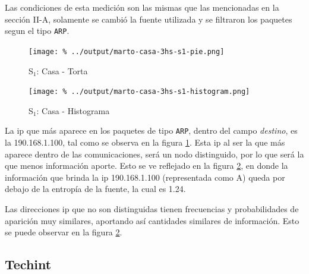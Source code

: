 \documentclass[final,inline,a4paper,narroweqnarray]{ieee}
\begin{document}
  Las condiciones de esta medición son las mismas que las mencionadas en la
  sección II-A, solamente se cambió la fuente utilizada y se filtraron los
  paquetes segun el tipo \texttt{ARP}.

    \begin{figure}[ht]\begin{center}
      \texttt{[image: \%
      ../output/marto-casa-3hs-s1-pie.png]}
      \vspace{-2em}
      \caption{S$_1$: Casa - Torta}
      \label{marto-casa-3hs-s1-pie}
    \end{center}\end{figure}

    \begin{figure}[ht]\begin{center}
      \texttt{[image: \%
      ../output/marto-casa-3hs-s1-histogram.png]}
      \vspace{-2em}
      \caption{S$_1$: Casa - Histograma}
      \label{marto-casa-3hs-s1-histogram}
    \end{center}\end{figure}	

  La ip que más aparece en los paquetes de tipo \texttt{ARP}, dentro del
  campo \textit{destino}, es la 190.168.1.100, tal como se observa en la
  figura \ref{marto-casa-3hs-s1-pie}. Esta ip al ser la que más aparece
  dentro de las comunicaciones, será un nodo distinguido, por lo que será la
  que menos información aporte. Esto se ve reflejado en la figura
  \ref{marto-casa-3hs-s1-histogram}, en donde la información que brinda la
  ip 190.168.1.100 (representada como A) queda por debajo de la entropía de
  la fuente, la cual es 1.24.  

  Las direcciones ip que no son distinguidas tienen frecuencias y
  probabilidades de aparición muy similares, aportando así
  cantidades similares de información. Esto se puede observar en la figura
  \ref{marto-casa-3hs-s1-histogram}.


  \subsection{Techint}
\end{document}
